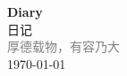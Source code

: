 \vspace*{\fill}
\begin{center}
    \textcolor{blue!50}{\Huge\textbf{Diary}} \\[1em]
    \textcolor{blue!60!pink}{\Large 日记} \\[2em]
    \textcolor{gray}{\large 厚德载物，有容乃大} \\[1em]
    \today
\end{center}
\vspace*{\fill}
\clearpage


\clearpage

\clearpage

\clearpage



